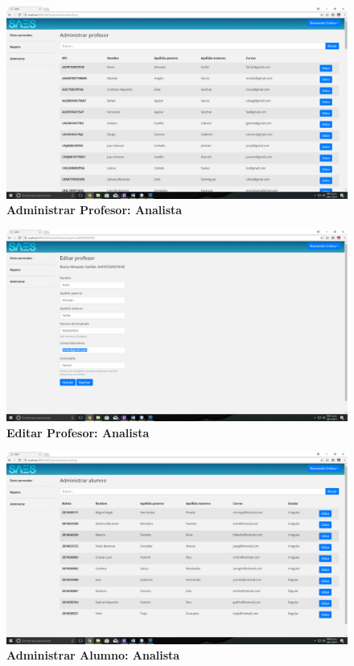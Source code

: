 \begin{figure}[H]
  \centering
    \includegraphics[scale=0.2]{project/images/40.png}
  \caption{\textbf{Administrar Profesor: Analista}}
\end{figure}
\begin{figure}[H]
  \centering
    \includegraphics[scale=0.2]{project/images/41.png}
  \caption{\textbf{Editar Profesor: Analista}}
\end{figure}
\begin{figure}[H]
  \centering
    \includegraphics[scale=0.2]{project/images/42.png}
  \caption{\textbf{Administrar Alumno: Analista}}
\end{figure}
